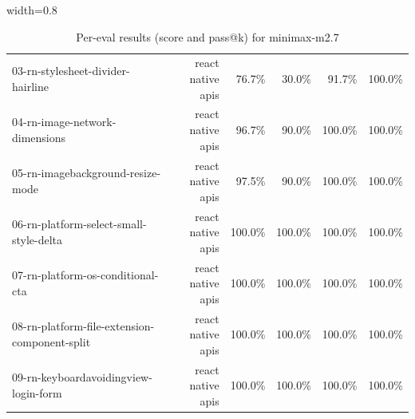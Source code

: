 \begin{table}[htbp]
\begin{adjustbox}{width=0.8\textwidth}
\begin{tabular}{lrrrrr}
03-rn-stylesheet-divider-hairline & react native apis & 76.7\% & 30.0\% & 91.7\% & 100.0\% \\
04-rn-image-network-dimensions & react native apis & 96.7\% & 90.0\% & 100.0\% & 100.0\% \\
05-rn-imagebackground-resize-mode & react native apis & 97.5\% & 90.0\% & 100.0\% & 100.0\% \\
06-rn-platform-select-small-style-delta & react native apis & 100.0\% & 100.0\% & 100.0\% & 100.0\% \\
07-rn-platform-os-conditional-cta & react native apis & 100.0\% & 100.0\% & 100.0\% & 100.0\% \\
08-rn-platform-file-extension-component-split & react native apis & 100.0\% & 100.0\% & 100.0\% & 100.0\% \\
09-rn-keyboardavoidingview-login-form & react native apis & 100.0\% & 100.0\% & 100.0\% & 100.0\% \\
\bottomrule
\end{tabular}
\end{adjustbox}
\caption{Per-eval results (score and pass@k) for minimax-m2.7}
\end{table}
